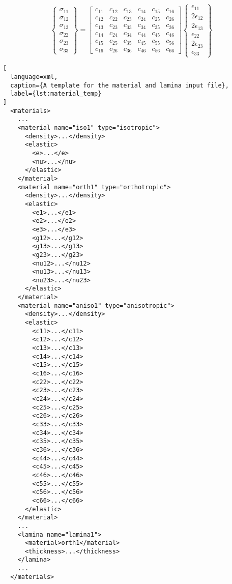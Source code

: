 \documentclass{book}
\begin{document}
\begin{equation} \label{eq:hookeslaw}
  \begin{Bmatrix}
    \sigma_{11} \\ \sigma_{12} \\ \sigma_{13} \\ \sigma_{22} \\ \sigma_{23} \\ \sigma_{33}
  \end{Bmatrix} =
  \begin{bmatrix}
    c_{11} & c_{12} & c_{13} & c_{14} & c_{15} & c_{16} \\
    c_{12} & c_{22} & c_{23} & c_{24} & c_{25} & c_{26} \\
    c_{13} & c_{23} & c_{33} & c_{34} & c_{35} & c_{36} \\
    c_{14} & c_{24} & c_{34} & c_{44} & c_{45} & c_{46} \\
    c_{15} & c_{25} & c_{35} & c_{45} & c_{55} & c_{56} \\
    c_{16} & c_{26} & c_{36} & c_{46} & c_{56} & c_{66}
  \end{bmatrix}
  \begin{Bmatrix}
    \epsilon_{11} \\ 2\epsilon_{12} \\ 2\epsilon_{13} \\ \epsilon_{22} \\ 2\epsilon_{23} \\ \epsilon_{33}
  \end{Bmatrix}
\end{equation}

\begin{lstlisting}[
  language=xml,
  caption={A template for the material and lamina input file},
  label={lst:material_temp}
]
  <materials>
    ...
    <material name="iso1" type="isotropic">
      <density>...</density>
      <elastic>
        <e>...</e>
        <nu>...</nu>
      </elastic>
    </material>
    <material name="orth1" type="orthotropic">
      <density>...</density>
      <elastic>
        <e1>...</e1>
        <e2>...</e2>
        <e3>...</e3>
        <g12>...</g12>
        <g13>...</g13>
        <g23>...</g23>
        <nu12>...</nu12>
        <nu13>...</nu13>
        <nu23>...</nu23>
      </elastic>
    </material>
    <material name="aniso1" type="anisotropic">
      <density>...</density>
      <elastic>
        <c11>...</c11>
        <c12>...</c12>
        <c13>...</c13>
        <c14>...</c14>
        <c15>...</c15>
        <c16>...</c16>
        <c22>...</c22>
        <c23>...</c23>
        <c24>...</c24>
        <c25>...</c25>
        <c26>...</c26>
        <c33>...</c33>
        <c34>...</c34>
        <c35>...</c35>
        <c36>...</c36>
        <c44>...</c44>
        <c45>...</c45>
        <c46>...</c46>
        <c55>...</c55>
        <c56>...</c56>
        <c66>...</c66>
      </elastic>
    </material>
    ...
    <lamina name="lamina1">
      <material>orth1</material>
      <thickness>...</thickness>
    </lamina>
    ...
  </materials>
\end{lstlisting}
\end{document}
